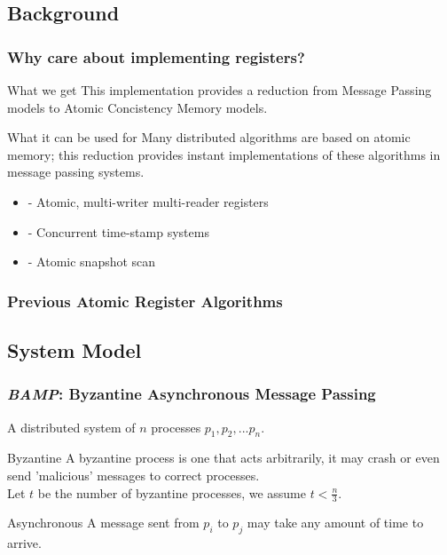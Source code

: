 \subsection{Background}
\begin{frame}
    \frametitle{Why care about implementing registers?}
    \begin{block}{What we get}
        This implementation provides a reduction from Message Passing models to Atomic Concistency Memory models.
    \end{block}
    \begin{block}{What it can be used for}
        Many distributed algorithms are based on atomic memory; this reduction provides instant implementations
        of these algorithms in message passing systems.
    \end{block}
    \begin{examples}
        \begin{itemize}
            \item - Atomic, multi-writer multi-reader registers 
            \item - Concurrent time-stamp systems
            \item - Atomic snapshot scan
        \end{itemize}
    \end{examples}
\end{frame}

\begin{frame}
    \frametitle{Previous Atomic Register Algorithms}
\end{frame}

\subsection{System Model}
\begin{frame}
    \frametitle{\emph{BAMP}: Byzantine Asynchronous Message Passing}
    A distributed system of $n$ processes $p_1, p_2, ... p_n$.
    \begin{block}{Byzantine}
        A byzantine process is one that acts arbitrarily, it may crash or even
        send 'malicious' messages to correct processes.\\
        Let $t$ be the number of byzantine processes, we assume $t<\frac{n}{3}$.
    \end{block}
    \begin{block}{Asynchronous}
        A message sent from $p_i$ to $p_j$ may take any amount of time to arrive.
    \end{block}
\end{frame}

